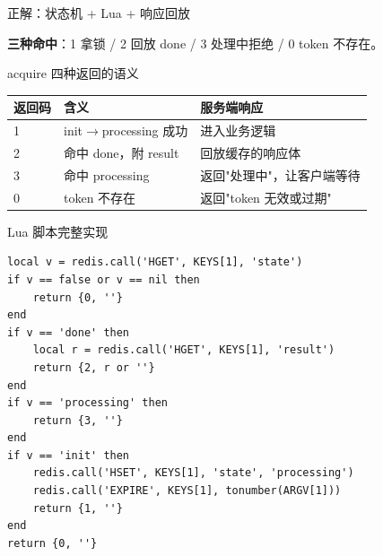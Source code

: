 \begin{frame}{正解：状态机 + Lua + 响应回放}
\vspace{2mm}
\small \textbf{三种命中}：1 拿锁 / 2 回放 done / 3 处理中拒绝 / 0 token 不存在。
\end{frame}

\begin{frame}{acquire 四种返回的语义}
\begin{tabular}{@{}lll@{}}
\toprule
返回码 & 含义 & 服务端响应 \\
\midrule
1 & init$\to$processing 成功 & 进入业务逻辑 \\
2 & 命中 done，附 result & 回放缓存的响应体 \\
3 & 命中 processing & 返回"处理中"，让客户端等待 \\
0 & token 不存在 & 返回"token 无效或过期" \\
\bottomrule
\end{tabular}
\vspace{3mm}
\end{frame}

\begin{frame}[fragile]{Lua 脚本完整实现}
\begin{lstlisting}[language=LuaRedis,firstnumber=32,
  caption={\srcnote{repository/cache/idempotency.go:32--50}}]
local v = redis.call('HGET', KEYS[1], 'state')
if v == false or v == nil then
    return {0, ''}
end
if v == 'done' then
    local r = redis.call('HGET', KEYS[1], 'result')
    return {2, r or ''}
end
if v == 'processing' then
    return {3, ''}
end
if v == 'init' then
    redis.call('HSET', KEYS[1], 'state', 'processing')
    redis.call('EXPIRE', KEYS[1], tonumber(ARGV[1]))
    return {1, ''}
end
return {0, ''}
\end{lstlisting}
\end{frame}


